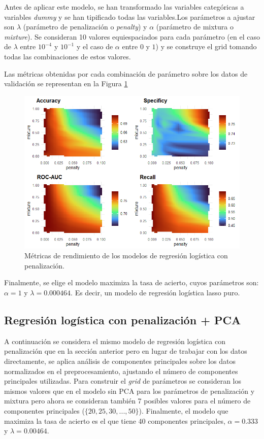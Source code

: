 \documentclass[12pt,a4paper,]{book}
\newcounter{dummy}
\numberwithin{dummy}{section}
\theoremstyle{ocrenumbox}
\theoremstyle{blacknumex}
\theoremstyle{blacknumbox}
\theoremstyle{ocrenum}
\theoremstyle{ocrenum}
\begin{document}
Antes de aplicar este modelo, se han transformado las variables
categóricas a variables \emph{dummy} y se han tipificado todas las
variables.Los parámetros a ajustar son \(\lambda\) (parámetro de
penalización o \emph{penalty}) y \(\alpha\) (parámetro de mixtura o
\emph{mixture}). Se consideran 10 valores equiespaciados para cada
parámetro (en el caso de \(\lambda\) entre \(10^{-4}\) y \(10^{-1}\) y
el caso de \(\alpha\) entre \(0\) y \(1\)) y se construye el grid
tomando todas las combinaciones de estos valores.

Las métricas obtenidas por cada combinación de parámetro sobre los datos
de validación se representan en la Figura \ref{fig:lr_tuningplot}

\begin{figure}[h]
\centering
\includegraphics[width =\textwidth]{graficos/lr_tuningplot.png}
\caption{Métricas de rendimiento de los modelos de regresión logística con penalización.}
\label{fig:lr_tuningplot}
\end{figure}

Finalmente, se elige el modelo maximiza la tasa de acierto, cuyos
parámetros son: \(\alpha= 1\) y \(\lambda = 0.000464\). Es decir, un
modelo de regresión logística lasso puro.

\hypertarget{regresiuxf3n-loguxedstica-con-penalizaciuxf3n-pca}{%
\subsection{Regresión logística con penalización +
PCA}\label{regresiuxf3n-loguxedstica-con-penalizaciuxf3n-pca}}

A continuación se considera el mismo modelo de regresión logística con
penalización que en la sección anterior pero en lugar de trabajar con
los datos directamente, se aplica análisis de componentes principales
sobre los datos normalizados en el preprocesamiento, ajustando el número
de componentes principales utilizadas. Para construir el \emph{grid} de
parámetros se consideran los mismos valores que en el modelo sin PCA
para los parámetros de penalización y mixtura pero ahora se consideran
también 7 posibles valores para el número de componentes principales
(\(\{20,25,30,...,50\}\)). Finalmente, el modelo que maximiza la tasa de
acierto es el que tiene 40 componentes principales, \(\alpha= 0.333\) y
\(\lambda = 0.00464\).
\end{document}
